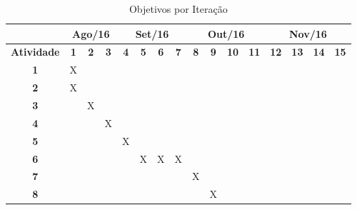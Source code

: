 \begin{table}[H]
\centering
\caption{Objetivos por Iteração}
\label{tab:work-plan}
\begin{tabular}{c|c|c|c|c|c|c|c|c|c|c|c|c|c|c|c|}
\cline{2-16}
{\bf}                                 & \multicolumn{3}{c|}{{\bf Ago/16}} & \multicolumn{4}{c|}{{\bf Set/16}}     & \multicolumn{4}{c|}{{\bf Out/16}}      & \multicolumn{4}{c|}{{\bf Nov/16}}     \\ \hline
\multicolumn{1}{|c|}{{\bf Atividade}} & {\bf 1} & {\bf 2} & {\bf 3}	      & {\bf 4} & {\bf 5} & {\bf 6} & {\bf 7} & {\bf 8} & {\bf 9} & {\bf 10} & \bf{11} & \bf{12} & \bf{13} & \bf{14} & \bf{15} \\ \hline
\multicolumn{1}{|c|}{{\bf 1}}         & X       &         &               &         &         &         &         &         &         &          &         &         &         &         &         \\ \hline
\multicolumn{1}{|c|}{{\bf 2}}         & X       &         &               &         &         &         &         &         &         &          &         &         &         &         &         \\ \hline
\multicolumn{1}{|c|}{{\bf 3}}         &         & X       &               &         &         &         &         &         &         &          &         &         &         &         &         \\ \hline
\multicolumn{1}{|c|}{{\bf 4}}         &         &         & X             &         &         &         &         &         &         &          &         &         &         &         &         \\ \hline
\multicolumn{1}{|c|}{{\bf 5}}         &         &         &               & X       &         &         &         &         &         &          &         &         &         &         &         \\ \hline
\multicolumn{1}{|c|}{{\bf 6}}         &         &         &               &         & X       & X       & X       &         &         &          &         &         &         &         &         \\ \hline
\multicolumn{1}{|c|}{{\bf 7}}         &         &         &               &         &         &         &         & X       &         &          &         &         &         &         &         \\ \hline
\multicolumn{1}{|c|}{{\bf 8}}         &         &         &               &         &         &         &         &         & X       &          &         &         &         &         &         \\ \hline

\end{tabular}
\end{table}
